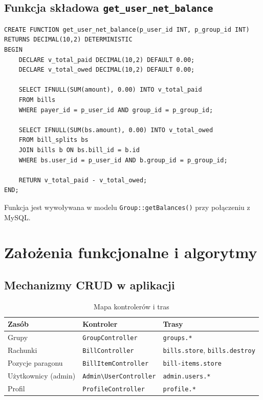 \documentclass[12pt,a4paper]{report}
\begin{document}
\section{Funkcja sk\l{}adowa \texttt{get\_user\_net\_balance}}

\begin{lstlisting}[style=sqlstyle, caption={Obliczanie salda netto u\.zytkownika w grupie}]
CREATE FUNCTION get_user_net_balance(p_user_id INT, p_group_id INT)
RETURNS DECIMAL(10,2) DETERMINISTIC
BEGIN
    DECLARE v_total_paid DECIMAL(10,2) DEFAULT 0.00;
    DECLARE v_total_owed DECIMAL(10,2) DEFAULT 0.00;

    SELECT IFNULL(SUM(amount), 0.00) INTO v_total_paid
    FROM bills
    WHERE payer_id = p_user_id AND group_id = p_group_id;

    SELECT IFNULL(SUM(bs.amount), 0.00) INTO v_total_owed
    FROM bill_splits bs
    JOIN bills b ON bs.bill_id = b.id
    WHERE bs.user_id = p_user_id AND b.group_id = p_group_id;

    RETURN v_total_paid - v_total_owed;
END;
\end{lstlisting}

Funkcja jest wywo\l{}ywana w modelu \texttt{Group::getBalances()} przy po\l{}\k{a}czeniu z MySQL.

\chapter{Za\l{}o\.zenia funkcjonalne i algorytmy}

\section{Mechanizmy CRUD w aplikacji}

\begin{table}[H]
\centering
\caption{Mapa kontroler\'ow i tras}
\begin{tabular}{@{}lll@{}}
\toprule
\textbf{Zas\'ob} & \textbf{Kontroler} & \textbf{Trasy} \\
\midrule
Grupy & \texttt{GroupController} & \texttt{groups.*} \\
Rachunki & \texttt{BillController} & \texttt{bills.store}, \texttt{bills.destroy} \\
Pozycje paragonu & \texttt{BillItemController} & \texttt{bill-items.store} \\
U\.zytkownicy (admin) & \texttt{Admin\textbackslash UserController} & \texttt{admin.users.*} \\
Profil & \texttt{ProfileController} & \texttt{profile.*} \\
\bottomrule
\end{tabular}
\end{table}
\end{document}
